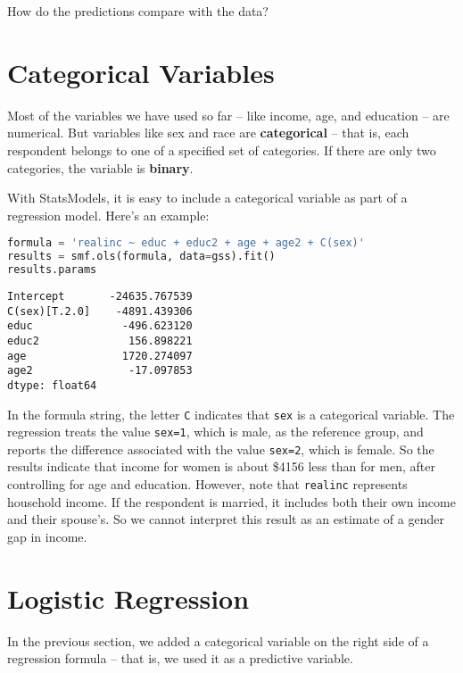 How do the predictions compare with the data?

\section{Categorical Variables}\label{categorical-variables}

Most of the variables we have used so far -- like income, age, and
education -- are numerical. But variables like sex and race are
\textbf{categorical} -- that is, each respondent belongs to one of a
specified set of categories. If there are only two categories, the
variable is \textbf{binary}.


With StatsModels, it is easy to include a categorical variable as part
of a regression model. Here's an example:

\begin{lstlisting}[language=Python,style=source]
formula = 'realinc ~ educ + educ2 + age + age2 + C(sex)'
results = smf.ols(formula, data=gss).fit()
results.params
\end{lstlisting}

\begin{lstlisting}[style=output]
Intercept       -24635.767539
C(sex)[T.2.0]    -4891.439306
educ              -496.623120
educ2              156.898221
age               1720.274097
age2               -17.097853
dtype: float64
\end{lstlisting}

In the formula string, the letter \passthrough{\lstinline!C!} indicates
that \passthrough{\lstinline!sex!} is a categorical variable. The
regression treats the value \passthrough{\lstinline!sex=1!}, which is
male, as the reference group, and reports the difference associated with
the value \passthrough{\lstinline!sex=2!}, which is female. So the
results indicate that income for women is about \$4156 less than for
men, after controlling for age and education. However, note that
\passthrough{\lstinline!realinc!} represents household income. If the
respondent is married, it includes both their own income and their
spouse's. So we cannot interpret this result as an estimate of a gender
gap in income.

\section{Logistic Regression}\label{logistic-regression}

In the previous section, we added a categorical variable on the right
side of a regression formula -- that is, we used it as a predictive
variable.

